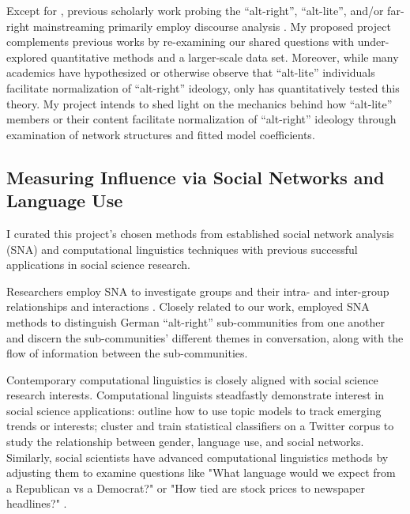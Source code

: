 \documentclass[acmlarge, screen, authorversion]{acmart}
\begin{document}
Except for \citet{ribeiroAuditingRadicalizationPathways2019}, previous scholarly work probing the
“alt-right”, “alt-lite”, and/or far-right mainstreaming
primarily employ discourse analysis \cite{cammaertsMainstreamingExtremeRightWing2018, gallaherMainstreamingWhiteSupremacy2020, lorenzo-dusDiscourseUSAltright2020, fergusWhitegenocideAltrightConspiracy2019}. My proposed project
complements previous works by re-examining our shared questions with
under-explored quantitative methods and a larger-scale data set. Moreover,
while many academics \cite{sternProudBoysWhite2019, nagleKillAllNormies2017, mainRiseAltRight2018} have hypothesized or otherwise observe that “alt-lite”
individuals facilitate normalization of “alt-right” ideology, only
\citet{ribeiroAuditingRadicalizationPathways2019} has quantitatively tested this theory. My
project intends to shed light on the mechanics behind how “alt-lite” members or their
content facilitate normalization of “alt-right” ideology through
examination of network structures and fitted model coefficients.

\subsection{Measuring Influence via Social Networks and Language Use}

I curated this project's chosen methods from established social network analysis (SNA) and computational linguistics techniques with previous successful applications in social science research. 

Researchers employ SNA to investigate groups and their intra- and inter-group relationships and interactions \cite{carringtonModelsMethodsSocial2005}. Closely related to our work, \citet{morstatterAltRightAltRechtsTwitter2018} employed SNA methods to distinguish German ``alt-right'' sub-communities from one another and discern the sub-communities' different themes in conversation, along with the flow of information between the sub-communities.

Contemporary computational linguistics is closely aligned with social science research interests. Computational linguists steadfastly demonstrate interest in social science applications: \citep{lauOnlineTrendAnalysis} outline how to use topic models to track emerging trends or interests; \cite{bammanGenderIdentityLexical2014} cluster and train statistical classifiers on a Twitter corpus to study the relationship between gender, language use, and social networks. Similarly, social scientists have advanced computational linguistics methods by adjusting them to examine questions like "What language would we expect from a Republican vs a Democrat?" or "How tied are stock prices to newspaper headlines?"  \cite{monroeFightinWordsLexical2008, gentzkowTextData2019}. 
\end{document}
